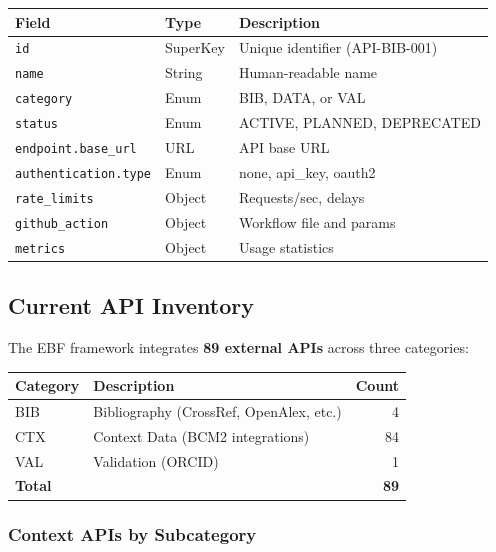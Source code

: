 \begin{center}
\begin{tabular}{lll}
\toprule
\textbf{Field} & \textbf{Type} & \textbf{Description} \\
\midrule
\texttt{id} & SuperKey & Unique identifier (API-BIB-001) \\
\texttt{name} & String & Human-readable name \\
\texttt{category} & Enum & BIB, DATA, or VAL \\
\texttt{status} & Enum & ACTIVE, PLANNED, DEPRECATED \\
\texttt{endpoint.base\_url} & URL & API base URL \\
\texttt{authentication.type} & Enum & none, api\_key, oauth2 \\
\texttt{rate\_limits} & Object & Requests/sec, delays \\
\texttt{github\_action} & Object & Workflow file and params \\
\texttt{metrics} & Object & Usage statistics \\
\bottomrule
\end{tabular}
\end{center}

\subsection{Current API Inventory}

The EBF framework integrates \textbf{89 external APIs} across three categories:

\begin{center}
\begin{tabular}{llr}
\toprule
\textbf{Category} & \textbf{Description} & \textbf{Count} \\
\midrule
BIB & Bibliography (CrossRef, OpenAlex, etc.) & 4 \\
CTX & Context Data (BCM2 integrations) & 84 \\
VAL & Validation (ORCID) & 1 \\
\midrule
\textbf{Total} & & \textbf{89} \\
\bottomrule
\end{tabular}
\end{center}

\subsubsection{Context APIs by Subcategory}

